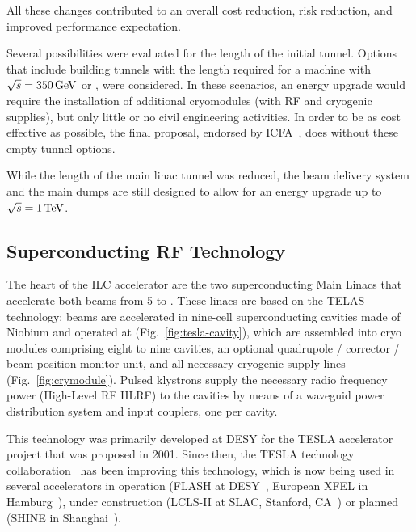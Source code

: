 All these changes contributed to an overall cost reduction, risk reduction, and improved performance expectation.

Several possibilities were evaluated for the length of the initial tunnel. 
Options that include building tunnels with the length required for a machine with $\sqrt{s} = 350\,{\mathrm{GeV}}$ or , were considered.
In these scenarios, an energy upgrade would require the installation of additional cryomodules (with RF and cryogenic supplies), but only little or no civil engineering activities.
In order to be as cost effective as possible, the final proposal, endorsed by ICFA~\cite{ICFA:2017}, does without these empty tunnel options. 

While the length of the main linac tunnel was reduced, the beam delivery system and the main dumps are still designed to allow for an energy upgrade up to  $\sqrt{s} = 1\,{\mathrm{TeV}}$.


\subsection{Superconducting RF Technology}


%
%
%
%


The heart of the ILC accelerator are the two superconducting Main Linacs that accelerate both beams from \num{5} to .
These linacs are based on the TELAS technology:
beams are accelerated in  nine-cell superconducting cavities made of Niobium and operated at  (Fig.~\ref{fig:tesla-cavity}), 
which are assembled into cryo modules comprising eight to nine cavities, an optional quadrupole / corrector / beam position monitor unit, and all necessary cryogenic supply lines (Fig.~\ref{fig:crymodule}). 
Pulsed klystrons supply the necessary radio frequency power (High-Level RF HLRF) to the cavities by means of a waveguid power distribution system and input couplers, one per cavity.

This technology was primarily developed at DESY for the TESLA accelerator project that was proposed in 2001.
Since then, the TESLA technology collaboration~\cite{bib:ttc} has been improving this technology, which is now being used in several accelerators in operation (FLASH at DESY~\cite{schreiber_faatz_2015,Vogt:2018wvy}, European XFEL in Hamburg~\cite{bib:xfel}), under construction (LCLS-II at SLAC, Stanford, CA~\cite{bib:lcls-ii}) or planned (SHINE in Shanghai~\cite{Zhao:2018lcl}).


